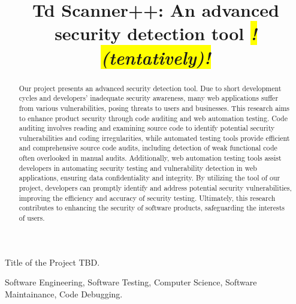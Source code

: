 \documentclass[journal]{IEEEtran}
\begin{document}
\title{%
Td Scanner++: An advanced security detection tool
\colorbox{yellow}{\textit{! (tentatively)!}}
}





%
{Title of the Project TBD.}

\maketitle

\begin{abstract}
Our project presents an advanced security detection tool. Due to short development cycles and developers' inadequate security awareness, many web applications suffer from various vulnerabilities, posing threats to users and businesses. This research aims to enhance product security through code auditing and web automation testing. Code auditing involves reading and examining source code to identify potential security vulnerabilities and coding irregularities, while automated testing tools provide efficient and comprehensive source code audits, including detection of weak functional code often overlooked in manual audits. Additionally, web automation testing tools assist developers in automating security testing and vulnerability detection in web applications, ensuring data confidentiality and integrity. By utilizing the tool of our project, developers can promptly identify and address potential security vulnerabilities, improving the efficiency and accuracy of security testing. Ultimately, this research contributes to enhancing the security of software products, safeguarding the interests of users.

\end{abstract}

\begin{IEEEkeywords}
Software Engineering, Software Testing, Computer Science, Software Maintainance, Code Debugging.
\end{IEEEkeywords}
\end{document}
